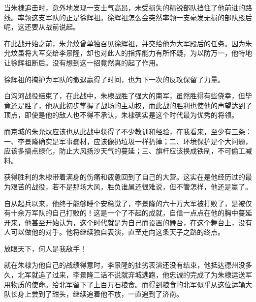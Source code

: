 \begin{multicols}{\theparacolNo}
		当朱棣追击时，意外地发现一支士气高昂，未受损失的精锐部队挡住了他前进的路线。率领这支军队的正是徐辉祖。徐辉祖怎么会突然率领一支毫发无损的部队殿后呢，这还要从战前说起。

		在此战开始之前，朱允炆曾单独召见徐辉祖，并交给他为大军殿后的任务。因为朱允炆虽将大军交给李景隆，却也对此人的指挥能力有所怀疑，为以防万一，他特地让徐辉祖断后。没有想到这一招竟然真的起了作用。

		徐辉祖的掩护为军队的撤退赢得了时间，也为下一次的反攻保留了力量。

		白沟河战役结束了，在此战中，朱棣战胜了强大的南军，虽然胜得有些侥幸，但毕竟还是胜了，他从此初步掌握了战场的主动权，而此战的胜利也使他的声望达到了顶点，即使是他的敌人也不得不承认，朱棣确实是这个时代最为优秀的将领。

		而京城的朱允炆应该也从此战中获得了不少教训和经验，在我看来，至少有三条：一、李景隆确实是军事蠢材，应该像扔垃圾一样扔掉；二、环境保护是个大问题，应该多搞点绿化，防止大风扬沙天气的蔓延；三、旗杆应该换成铁制，不可偷工减料。

		获得胜利的朱棣带着满身的伤痛和疲惫回到了自己的大营。这实在是他经历过的最为艰苦的战役，若不是那场大风，胜负谁属还很难说，但不管怎样，他还是赢了。

		自从起兵以来，他终于能够睡个安稳觉了，李景隆的六十万大军被打败了，是被仅有十余万军队的自己打败的！这是一个了不起的成就，自信一点点在他的胸中蔓延开来，他甚至开始认为，这个时代就是为自己而设置的舞台，在这个舞台上，没有人可以做他的对手。他将继续独自表演，直至走向这条天子之路的终点。

		放眼天下，何人是我敌手！

		就在朱棣为他自己的战绩得意时，李景隆的拙劣表演还没有结束，他抵达德州没多久，北军就追了过来，李景隆二话不说就弃城逃跑，他忠诚的完成了为朱棣运送军用物质的使命。给北军留下了上百万石粮食。而得到粮食的北军似乎从这位运输大队长身上尝到了甜头，继续追着他不放，一直追到了济南。
		\ifnum{}
	\end{multicols}
\fi
\newpage
